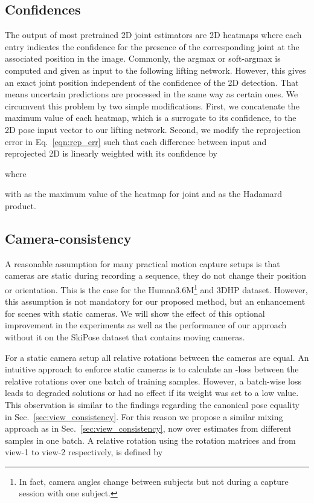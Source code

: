 \documentclass[final]{cvpr}
\begin{document}
\subsection{Confidences}
The output of most pretrained 2D joint estimators are 2D heatmaps where each entry indicates the confidence for the presence of the corresponding joint at the associated position in the image.
Commonly, the argmax or soft-argmax is computed and given as input to the following lifting network.
However, this gives an exact joint position independent of the confidence of the 2D detection.
That means uncertain predictions are processed in the same way as certain ones.
We circumvent this problem by two simple modifications.
First, we concatenate the maximum value of each heatmap, which is a surrogate to its confidence, to the 2D pose input vector to our lifting network.
Second, we modify the reprojection error in Eq.~\ref{eqn:rep_err} such that each difference between input and reprojected 2D is linearly weighted with its confidence by

where 

with  as the maximum value of the heatmap for joint  and  as the Hadamard product.


\subsection{Camera-consistency}
A reasonable assumption for many practical motion capture setups is that cameras are static during recording a sequence, \ie they do not change their position or orientation.
This is the case for the Human3.6M\footnote{In fact, camera angles change between subjects but not during a capture session with one subject.} and 3DHP dataset.
However, this assumption is not mandatory for our proposed method, but an enhancement for scenes with static cameras.
We will show the effect of this optional improvement in the experiments as well as the performance of our approach without it on the SkiPose dataset that contains moving cameras.

For a static camera setup all relative rotations between the cameras are equal.
An intuitive approach to enforce static cameras is to calculate an -loss between the relative rotations over one batch of training samples.
However, a batch-wise loss leads to degraded solutions or had no effect if its weight was set to a low value.
This observation is similar to the findings regarding the canonical pose equality in Sec.~\ref{sec:view_consistency}.
For this reason we propose a similar mixing approach as in Sec.~\ref{sec:view_consistency}, now over estimates from different samples in one batch.
A relative rotation  using the rotation matrices  and  from view-1 to view-2 respectively, is defined by
\end{document}
